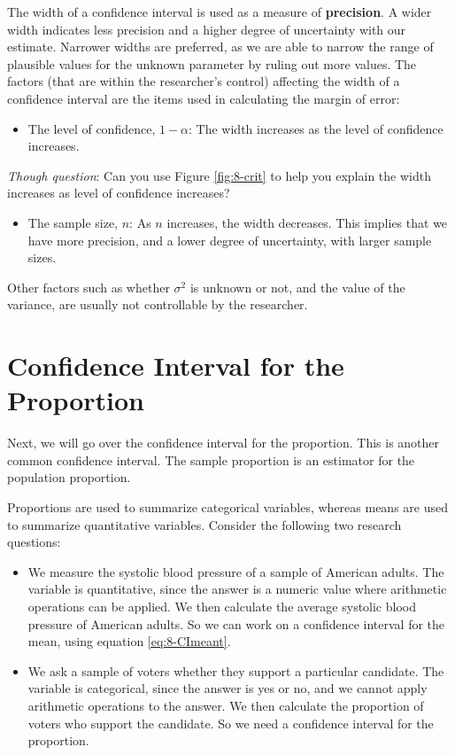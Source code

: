 \documentclass[
]{book}
\providecommand{\tightlist}{%
  \setlength{\itemsep}{0pt}\setlength{\parskip}{0pt}}
\theoremstyle{definition}
\theoremstyle{definition}
\theoremstyle{definition}
\theoremstyle{definition}
\theoremstyle{remark}
\begin{document}
The width of a confidence interval is used as a measure of \textbf{precision}. A wider width indicates less precision and a higher degree of uncertainty with our estimate. Narrower widths are preferred, as we are able to narrow the range of plausible values for the unknown parameter by ruling out more values. The factors (that are within the researcher's control) affecting the width of a confidence interval are the items used in calculating the margin of error:

\begin{itemize}
\tightlist
\item
  The level of confidence, \(1 - \alpha\): The width increases as the level of confidence increases.
\end{itemize}

\emph{Though question}: Can you use Figure \ref{fig:8-crit} to help you explain the width increases as level of confidence increases?

\begin{itemize}
\tightlist
\item
  The sample size, \(n\): As \(n\) increases, the width decreases. This implies that we have more precision, and a lower degree of uncertainty, with larger sample sizes.
\end{itemize}

Other factors such as whether \(\sigma^2\) is unknown or not, and the value of the variance, are usually not controllable by the researcher.

\hypertarget{CIprop}{%
\section{Confidence Interval for the Proportion}\label{CIprop}}

Next, we will go over the confidence interval for the proportion. This is another common confidence interval. The sample proportion is an estimator for the population proportion.

Proportions are used to summarize categorical variables, whereas means are used to summarize quantitative variables. Consider the following two research questions:

\begin{itemize}
\item
  We measure the systolic blood pressure of a sample of American adults. The variable is quantitative, since the answer is a numeric value where arithmetic operations can be applied. We then calculate the average systolic blood pressure of American adults. So we can work on a confidence interval for the mean, using equation \eqref{eq:8-CImeant}.
\item
  We ask a sample of voters whether they support a particular candidate. The variable is categorical, since the answer is yes or no, and we cannot apply arithmetic operations to the answer. We then calculate the proportion of voters who support the candidate. So we need a confidence interval for the proportion.
\end{itemize}
\end{document}
